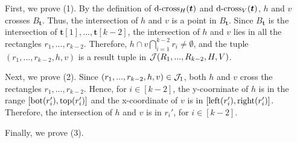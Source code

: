 First, we prove (1). By the definition of $\mathrm{d\text{-}cross}_H(\textrm{\boldmath${t}$})$ and $\mathrm{d\text{-}cross}_V(\textrm{\boldmath${t}$})$, $h$ and $v$ crosses $B_\bm{t}$. Thus, the intersection of $h$ and $v$ is a point in $B_\bm{t}$. Since $B_\bm{t}$ is the intersection of $\bm{t}[1],...,\bm{t}[k-2]$, the intersection of $h$ and $v$ lies in all the rectangles $r_1,...,r_{k-2}$. Therefore, $h\cap v\bigcap_{i = 1}^{k-2}r_i \neq \emptyset$, and  the tuple $(r_1,...,r_{k-2},h,v)$ is a result tuple in $\mathcal{J}(R_1,...,R_{k-2},H,V)$. 

Next, we prove (2). Since $(r_1,...,r_{k-2},h,v)\in \mathcal{J}_1$, both $h$
 and $v$ cross the rectangles $r_1,...,r_{k-2}$. Hence, for $i\in[k-2]$, the y-coorninate of $h$ is in the range $[\mathrm{bot}(r_i'), \mathrm{top}(r_i')]$ and the x-coordinate of $v$ is in $[\mathrm{left}(r_i'), \mathrm{right}(r_i')]$. Therefore, the intersection of $h$ and $v$ is in $r_i'$, for $i\in[k-2]$.

Finally, we prove (3).